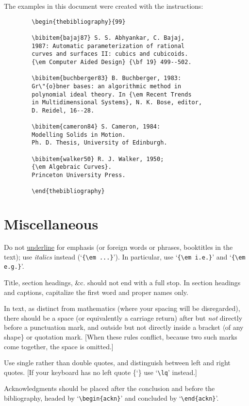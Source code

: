 The examples in this document were created with the instructions:
\begin{verbatim}
        \begin{thebibliography}{99}
 
        \bibitem{bajaj87} S. S. Abhyankar, C. Bajaj,
        1987: Automatic parameterization of rational
        curves and surfaces II: cubics and cubicoids.
        {\em Computer Aided Design} {\bf 19} 499--502.
 
        \bibitem{buchberger83} B. Buchberger, 1983:
        Gr\"{o}bner bases: an algorithmic method in
        polynomial ideal theory. In {\em Recent Trends
        in Multidimensional Systems}, N. K. Bose, editor,
        D. Reidel, 16--28.
 
        \bibitem{cameron84} S. Cameron, 1984:
        Modelling Solids in Motion.
        Ph. D. Thesis, University of Edinburgh.
 
        \bibitem{walker50} R. J. Walker, 1950;
        {\em Algebraic Curves}.
        Princeton University Press.
 
        \end{thebibliography}
\end{verbatim}
 
\section{Miscellaneous}\label{s6}
 
Do not \underline{underline} for emphasis (or foreign words or phrases,
booktitles in the text); use {\em italics} instead (`\verb!{\em ...}!').
In particular, use `\verb!{\em i.e.}!' and `\verb!{\em e.g.}!'.
 
Title, section headings, \&c. should not end with a full stop. In section
headings and captions, capitalize the first word and proper names only.
 
In text, as distinct from mathematics (where your spacing will be
disregarded), there should be a space (or equivalently a carriage return)
after but {\em not} directly before a punctuation mark, and outside but not
directly inside a bracket $\langle$of any shape\} or quotation mark.  [When
these rules conflict, because two such marks come together, the space is
omitted.]
 
Use single rather than double quotes, and distinguish between left and
right quotes. [If your keyboard has no left quote \{`\} use `\verb!\lq!'
instead.]
 
\begin{ackn}\label{ack}
Acknowledgments should be placed after the conclusion and before the
bibliography, headed by `\verb!\begin{ackn}!' and concluded by
`\verb!\end{ackn}!'.
\end{ackn}
 
